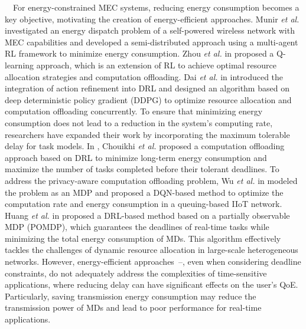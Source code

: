 \documentclass[12pt,draftclsnofoot,onecolumn]{IEEEtran}
\newenvironment{my}[2]%
{\begin{list}{}%
{\setlength{\rightmargin}{#1}\setlength{\leftmargin}{#2}}%


 \item[]{}

} {\end{list}}
\begin{document}
\begin{enumerate}
\begin{my}{1cm}{1cm}
{		\,\,\,\,
		For energy-constrained MEC systems, reducing energy consumption becomes a key objective, motivating the creation of energy-efficient approaches. 
		Munir \textit{et al.} \cite{munir2021multi}  investigated an energy dispatch problem of a self-powered wireless network with MEC capabilities and developed a semi-distributed approach using a multi-agent RL framework to minimize energy consumption.
		Zhou \textit{et al.} in \cite{zhou2021deep} proposed a Q-learning approach, which is an extension of RL to achieve optimal resource allocation strategies and computation offloading.
		Dai \textit{et al.} in \cite{dai2020edge} introduced the integration of action refinement into DRL and designed an algorithm based on deep deterministic policy gradient (DDPG) to optimize resource allocation and computation offloading concurrently. 
		To ensure that minimizing energy consumption does not lead to a reduction in the system's computing rate, researchers have expanded their work by incorporating the maximum tolerable delay for task models.
		In \cite{chouikhi2023energy}, Chouikhi \textit{et al.} proposed a computation offloading approach based on DRL to minimize long-term energy consumption and maximize the number of tasks completed before their tolerant deadlines.
		To address the privacy-aware computation offloading problem, Wu \textit{et al.} in \cite{wu2024combining} modeled the problem as an MDP and proposed a DQN-based method to optimize the computation rate and energy consumption in a queuing-based IIoT network. 
		Huang \textit{et al.} in \cite{huang2021deadline} proposed a DRL-based method based on a partially observable MDP (POMDP), which guarantees the deadlines of real-time tasks while minimizing the total energy consumption of MDs. This algorithm effectively tackles the challenges of dynamic resource allocation in large-scale heterogeneous networks. 
		However, energy-efficient approaches~\cite{munir2021multi}--\cite{huang2021deadline}, even when considering deadline constraints, do not adequately address the complexities of time-sensitive applications, where reducing delay can have significant effects on the user's QoE. Particularly, saving transmission energy consumption may reduce the transmission power of MDs and lead to poor performance for real-time applications. \vspace{2mm}
		
}
\end{my}
\end{enumerate}
\end{document}
